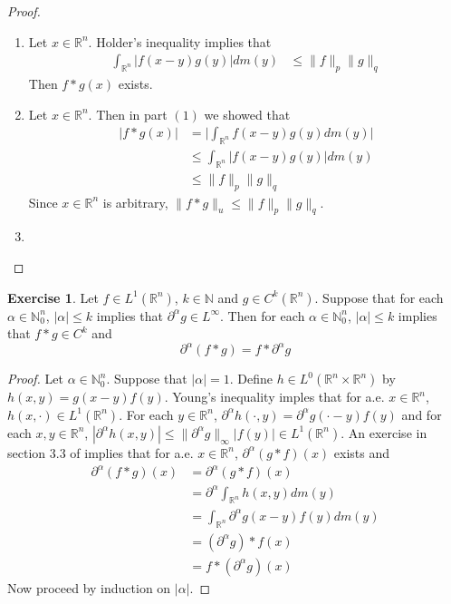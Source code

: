 \documentclass{book}
\theoremstyle{definition}
\newtheorem{ex}[definition]{Exercise}
\newcommand{\al}{\alpha}
\newcommand{\N}{\mathbb{N}}
\newcommand{\R}{\mathbb{R}}
\newcommand{\lex}[1]{\label{ex:#1}}
\DeclareMathOperator*{\0}{\mbf{0}}
\DeclareMathOperator*{\1}{\mbf{1}}
\newcommand{\p}{\partial}
\begin{document}
	\begin{proof}
	\begin{enumerate}
	\item Let $x \in \R^n$. Holder's inequality implies that 
	\begin{align*}
	\int_{\R^n}|f(x-y)g(y)| dm(y) 
	& \leq \|f\|_p \|g\|_q 
	\end{align*}
	Then $f*g(x)$ exists. 
	\item Let $x \in \R^n$. Then in part $(1)$ we showed that  
	\begin{align*}
	|f*g(x)| 
	&= \bigg| \int_{\R^n} f(x - y)g(y) dm(y)\bigg| \\
	&\leq  \int_{\R^n} |f(x-y)g(y)| dm(y) \\
	& \leq \|f\|_p \|g\|_q
	\end{align*}
	Since $x \in \R^n$ is arbitrary, $\|f*g\|_u \leq \|f\|_p \|g\|_q $.
	\item 
	\end{enumerate}
	\end{proof}
	
	\begin{ex}
	\lex{206} Let $f \in L^1(\R^n)$, $k \in \N$ and $g \in C^k(\R^n)$. Suppose that for each $\al \in \N_0^n$, $|\al| \leq k$ implies that $\p^{\al} g \in L^{\infty}$. Then for each $\al \in \N_0^n$, $|\al| \leq k$ implies that $f *  g \in C^{k}$ and $$\p^{\al}(f*g) = f*\p^{\al}g$$
	\end{ex}
	
	\begin{proof}
	Let $\al \in \N_0^n$. Suppose that $|\al| = 1$. Define $h \in L^0(\R^n \times \R^n)$ by $h(x,y) = g(x-y)f(y)$. Young's inequality imples that for a.e. $ x \in \R^n$, $h(x, \cdot) \in L^1(\R^n)$. For each $y \in \R^n$, $\p^{\al} h (\cdot,y) = \p^{\al}g(\cdot -y)f(y)$ and for each $x,y \in \R^n$, $|\p^{\al} h (x,y)| \leq \|\p^{\al} g\|_{\infty}|f(y)| \in L^1(\R^n)$. An exercise in section $3.3$ of 
	\cite{measure}
	implies that for a.e. $x \in \R^n$, $\p^{\al} (g*f)(x)$ exists and 
	\begin{align*}
	\p^{\al} (f*g)(x) 
	&= \p^{\al} (g * f)(x) \\
	&= \p^{\al}\int_{\R^n} h(x,y) dm(y) \\
	&= \int_{\R^n} \p^{\al} g(x -y)f(y) dm(y) \\
	&= (\p^{\al} g) * f (x) \\
	&=  f * (\p^{\al} g) (x)   
	\end{align*}	 
	Now proceed by induction on $|\al|$.
	\end{proof}
	
\end{document}
